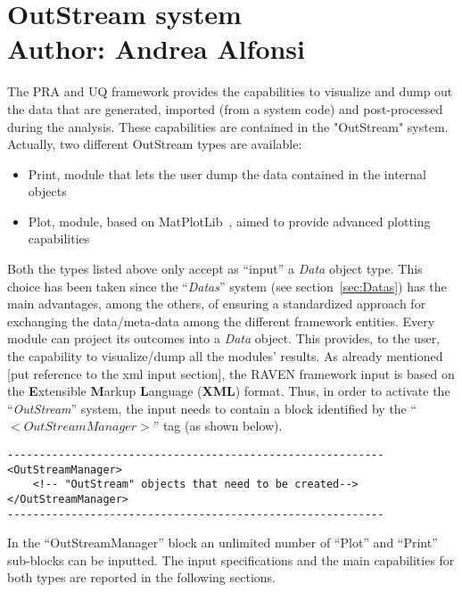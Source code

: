 \section{OutStream system \\ \vspace{2 mm} {\small Author: Andrea Alfonsi}}
The PRA and UQ framework provides the capabilities to visualize and dump out the data that are  generated, imported (from a system code) and post-processed during the analysis. These capabilities are contained in the "OutStream" system. Actually, two different OutStream types are available:
\vspace{-5mm}
\begin{itemize}
\itemsep0em
\item Print, module that lets the user dump the data contained in the internal objects 
\item Plot, module, based on MatPlotLib~\cite{MatPlotLib}, aimed to provide advanced plotting capabilities 
\end{itemize}
\vspace{-5mm}

Both the types listed above only accept as ``input'' a \textit{Data} object type. This choice has been taken since the ``\textit{Datas}'' system (see section~\ref{sec:Datas}) has the main advantages, among the others, of ensuring a standardized approach for exchanging the data/meta-data among the different framework entities. Every module can project its outcomes into a \textit{Data} object. This provides, to the user, the capability to visualize/dump all the modules' results. 
As already mentioned [put reference to the xml input section], the RAVEN framework input is based on the \textbf{E}xtensible \textbf{M}arkup \textbf{L}anguage (\textbf{XML}) format. Thus, in order to activate the ``\textit{OutStream}'' system, the input needs to contain a block identified by the ``\textbf{$<OutStreamManager>$}'' tag (as shown below).  

\begin{lstlisting}[style=XML]
-----------------------------------------------------------
<OutStreamManager>
    <!-- "OutStream" objects that need to be created-->
</OutStreamManager>
-----------------------------------------------------------
\end{lstlisting}
In the ``OutStreamManager'' block an unlimited number of ``Plot'' and ``Print'' sub-blocks can be inputted. The input specifications and the main capabilities for both types are reported in the following sections.
%
%
